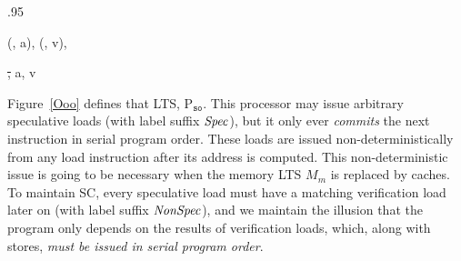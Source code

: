 \begin{figure*}[t]
\small
\centering
\begin{boxedminipage}[c]{.95\textwidth}
\inference[Fetch]
{}
{}

\inference[Compute]
{}
{}

{
{(\ld\req, a), (\ld\resp, v), \Spec}}

{}

{}

{}

{
{\st, a, v}}

{}

{}
\end{boxedminipage}

\caption{Speculating, out-of-order issue processor}
\label{Ooo}
\end{figure*}

Figure~\ref{Ooo} defines that LTS, P$_{\texttt{so}}$. This processor may issue
arbitrary speculative loads (with label suffix $\mathit{Spec}$), but it only ever
\emph{commits} the next instruction in serial program order. These loads are
issued non-deterministically from any load instruction after its address is
computed.  This non-deterministic issue is going to be necessary when the
memory LTS $M_m$ is replaced by caches.  To maintain SC, every speculative load
must have a matching verification load later on (with label suffix $\mathit{NonSpec}$),
and we maintain the illusion that the program only depends on the results of
verification loads, which, along with stores, \emph{must be issued in serial
program order}.

